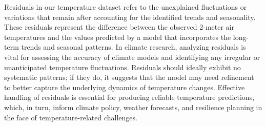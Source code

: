 \documentclass[sn-mathphys,Numbered]{sn-jnl}
\theoremstyle{thmstyleone}
\theoremstyle{thmstyletwo}
\theoremstyle{thmstylethree}
\begin{document}
Residuals in our temperature dataset refer to the unexplained fluctuations or variations that remain after accounting for the identified trends and seasonality. These residuals represent the difference between the observed 2-meter air temperatures and the values predicted by a model that incorporates the long-term trends and seasonal patterns. In climate research, analyzing residuals is vital for assessing the accuracy of climate models and identifying any irregular or unanticipated temperature fluctuations. Residuals should ideally exhibit no systematic patterns; if they do, it suggests that the model may need refinement to better capture the underlying dynamics of temperature changes. Effective handling of residuals is essential for producing reliable temperature predictions, which, in turn, inform climate policy, weather forecasts, and resilience planning in the face of temperature-related challenges.







\end{document}
